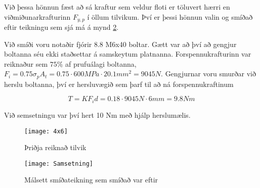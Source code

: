 Við þessa hönnun fæst að sá kraftur sem veldur floti er töluvert hærri en viðmiðunarkrafturinn $F_{y,p}$ í öllum tilvikum. 
Því er þessi hönnun valin og smíðað eftir teikningu sem sjá má á mynd \ref{fig::smidamynd}.

Við smíði voru notaðir fjórir 8.8 M6x40 boltar. Gætt var að því að gengjur boltanna séu ekki staðsettar á samskeytum platnanna. Forspennukrafturinn var reiknaður sem $ 75\% $ af prufuálagi boltanna, \te 
$F_i = 0.75 \sigma_p A_t = 0.75 \cdot 600 MPa \cdot 20.1 mm^2 = 9045N$. Gengjurnar voru smurðar við herslu boltanna, því er hersluvægið sem þarf til að ná forspennukraftinum 

\[
T = K F_i d = 0.18 \cdot 9045N \cdot 6mm = 9.8 Nm
\]

Við semsetningu var því hert 10 Nm með hjálp herslumælis.

\begin{figure}
  \centering
  \texttt{[image: 4x6]}
  \caption{Þriðja reiknað tilvik}
  \label{fig::4x6}
\end{figure}

\begin{figure}
	\centering
	\texttt{[image: Samsetning]}
	\caption{Málsett smíðateikning sem smíðað var eftir}
	\label{fig::smidamynd}
\end{figure}